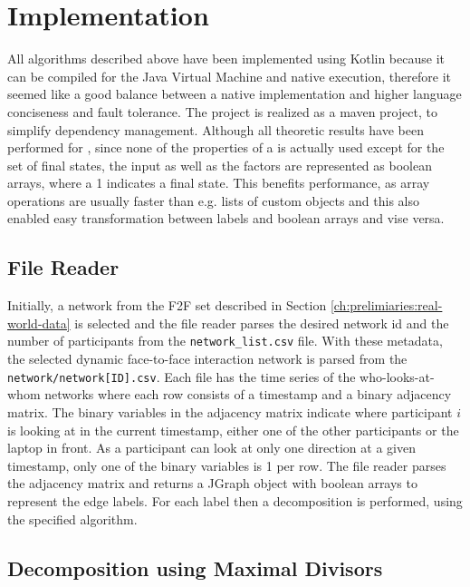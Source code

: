 \chapter{Implementation}
\label{ch:Implementation}
All algorithms described above have been implemented using Kotlin because it can be compiled for the Java Virtual Machine and native execution, therefore it seemed like a good balance between a native implementation and higher language conciseness and fault tolerance.
The project is realized as a maven project, to simplify dependency management.
Although all theoretic results have been performed for \DFAs, since none of the properties of a \DFA is actually used except for the set of final states, the input as well as the factors are represented as boolean arrays, where a 1 indicates a final state.
This benefits performance, as array operations are usually faster than e.g. lists of custom objects and this also enabled easy transformation between labels and boolean arrays and vise versa. 

\section{File Reader}
\label{ch:Implementation:file-reader}
Initially, a network from the F2F set described in Section \ref{ch:prelimiaries:real-world-data} is selected and the file reader parses the desired network id and the number of participants from the \verb*|network_list.csv| file.
With these metadata, the selected dynamic face-to-face interaction network is parsed from the \verb*|network/network[ID].csv|.
Each file has the time series of the who-looks-at-whom networks where each row consists of a timestamp and a binary adjacency matrix.
The binary variables in the adjacency matrix indicate where participant $i$ is looking at in the current timestamp, either one of the other participants or the laptop in front.
As a participant can look at only one direction at a given timestamp, only one of the binary variables is 1 per row.
The file reader parses the adjacency matrix and returns a JGraph object with boolean arrays to represent the edge labels.
For each label then a decomposition is performed, using the specified algorithm.

\section{Decomposition using Maximal Divisors}
\label{ch:Implementation:max-divisor}

